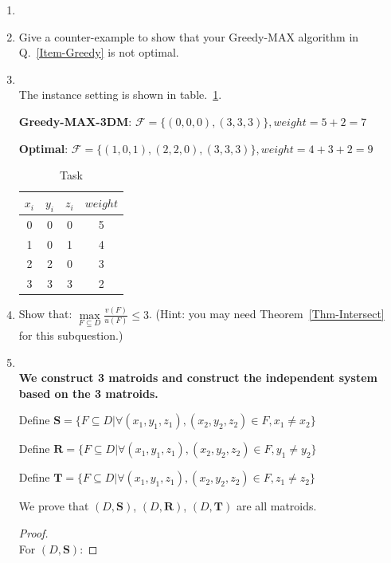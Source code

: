 \documentclass[12pt,a4paper]{article}
\makeatletter
\newtheorem*{solution}{Solution}
\theoremstyle{definition}
\renewenvironment{solution}[1][Solution] {\par\pushQED{\qed}\normalfont\topsep6\p@\@plus6\p@\relax\trivlist\item[\hskip\labelsep\bfseries#1\@addpunct{.}]\ignorespaces}{\popQED\endtrivlist\@endpefalse} \makeatother
\makeatother
\begin{document}
\begin{enumerate}
\begin{enumerate}
\begin{solution}
	\end{solution}
	
    	\item Give a counter-example to show that your Greedy-MAX algorithm in Q.~\ref{Item-Greedy} is not optimal.
	\begin{solution}
	~\\
	The instance setting is shown in table.~\ref{tab:2}. 
	
	\textbf{Greedy-MAX-3DM}: $\mathcal{F} = \{ (0,0,0), (3,3,3)\}, weight=5+2=7$
	
	\textbf{Optimal}: $\mathcal{F} = \{ (1,0,1), (2,2,0),(3,3,3)\}, weight=4+3+2=9$

	\begin{table}[H]
			\setlength{\abovecaptionskip}{0.cm}
			\setlength{\belowcaptionskip}{0.5cm}
			\centering
			\caption{Task}
			\label{tab:2}			
			\begin{tabular}{|c|c|c|c|}
				\hline
				$ x_i$ & $y_i$ & $z_i$ & $weight$\\
				\hline
				0&0&0&5\\
				\hline
				1&0&1&4\\
				\hline
				2&2&0&3\\
				\hline
				3&3&3&2\\
				\hline
					
			\end{tabular}
		\end{table}
	\end{solution}
    	\item Show that: $\max\limits_{F \subseteq D} \frac{v(F)}{u(F)} \leq 3$. {\color{blue}(Hint: you may need Theorem~\ref{Thm-Intersect} for this subquestion.)} 
    	    \begin{solution}
	    ~\\
	    \textbf{We construct 3 matroids and construct the independent system based on the 3 matroids.}
	    
	    Define $\mathbf{S}=\{F\subseteq D| \forall (x_1,y_1,z_1), (x_2,y_2,z_2) \in F, x_1\neq x_2 \}$
	    
	    	    Define $\mathbf{R}=\{F\subseteq D| \forall (x_1,y_1,z_1), (x_2,y_2,z_2) \in F, y_1\neq y_2 \}$
		    
		    	    Define $\mathbf{T}=\{F\subseteq D| \forall (x_1,y_1,z_1), (x_2,y_2,z_2) \in F, z_1\neq z_2 \}$
		
		We prove that    $(D, \mathbf{S})$, $(D, \mathbf{R})$, $(D, \mathbf{T})$ are all matroids.
		
	\begin{proof}
	~\\
	For $(D, \mathbf{S})$:
	

\end{proof}
\end{solution}
\end{enumerate}
\end{enumerate}
\end{document}

